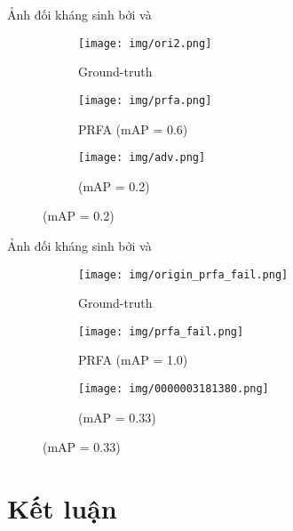 \documentclass[aspectratio=169, 12pt]{beamer}
\begin{document}
\begin{frame}{Ảnh đối kháng sinh bởi \prfa và \propose}  

\begin{figure}[!hbpt]    
\small
\begin{subfigure}{.3\textwidth}
  \centering
  \texttt{[image: img/ori2.png]}
  \caption{Ground-truth}
\end{subfigure}%
\hfill
\begin{subfigure}{.3\textwidth}
  \centering
  \texttt{[image: img/prfa.png]}
  \caption{PRFA (mAP = 0.6)}
\end{subfigure}%
\hfill
\begin{subfigure}{.3\textwidth}
  \centering
  \texttt{[image: img/adv.png]}
  \caption{\propose (mAP = 0.2)}
\end{subfigure}%
\label{fig:demo1}
\end{figure}

\end{frame}

\begin{frame}{Ảnh đối kháng sinh bởi \prfa và \propose}  

\begin{figure}[!hbpt]    
\small
\begin{subfigure}{.3\textwidth}
  \centering
  \texttt{[image: img/origin\_prfa\_fail.png]}
  \caption{Ground-truth}
\end{subfigure}%
\hfill
\begin{subfigure}{.3\textwidth}
  \centering
  \texttt{[image: img/prfa\_fail.png]}
  \caption{PRFA (mAP = 1.0)}
\end{subfigure}%
\hfill
\begin{subfigure}{.3\textwidth}
  \centering
  \texttt{[image: img/0000003181380.png]}
  \caption{\propose (mAP = 0.33)}
\end{subfigure}%
\label{fig:demo1}
\end{figure}

\end{frame}
 
	
\section{Kết luận}
\end{document}
